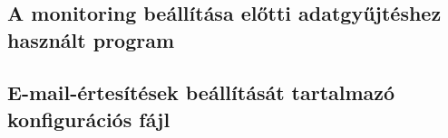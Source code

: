 \appendix
\chapter*{\fuggelek}
\setcounter{chapter}{\appendixnumber}
\linespread{1}

\section{A monitoring beállítása előtti adatgyűjtéshez használt program}



\clearpage\section{E-mail-értesítések beállítását tartalmazó konfigurációs fájl}

